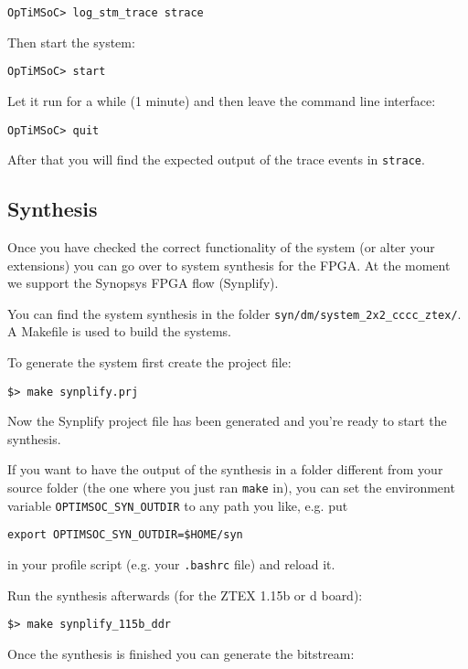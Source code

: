 \begin{lstlisting}
OpTiMSoC> log_stm_trace strace
\end{lstlisting}

Then start the system:
\begin{lstlisting}
OpTiMSoC> start
\end{lstlisting}

Let it run for a while (1 minute) and then leave the command line
interface:
\begin{lstlisting}
OpTiMSoC> quit
\end{lstlisting}

After that you will find the expected output of the trace events in
\verb|strace|.

\subsection{Synthesis}

Once you have checked the correct functionality of the system (or
alter your extensions) you can go over to system synthesis for the
FPGA. At the moment we support the Synopsys FPGA flow (Synplify).

You can find the system synthesis in the folder
\verb|syn/dm/system_2x2_cccc_ztex/|. A Makefile is used to build the
systems.

To generate the system first create the project file:

\begin{lstlisting}
$> make synplify.prj
\end{lstlisting}

Now the Synplify project file has been generated and you're ready to start the
synthesis.

If you want to have the output of the synthesis in a folder different from your
source folder (the one where you just ran \verb|make| in), you can set the
environment variable \verb|OPTIMSOC_SYN_OUTDIR| to any path you like, e.g. put
\begin{lstlisting}
export OPTIMSOC_SYN_OUTDIR=$HOME/syn
\end{lstlisting}
in your profile script (e.g. your \verb|.bashrc| file) and reload it.

Run the synthesis afterwards (for the ZTEX 1.15b or d board):

\begin{lstlisting}
$> make synplify_115b_ddr
\end{lstlisting}

Once the synthesis is finished you can generate the bitstream:

